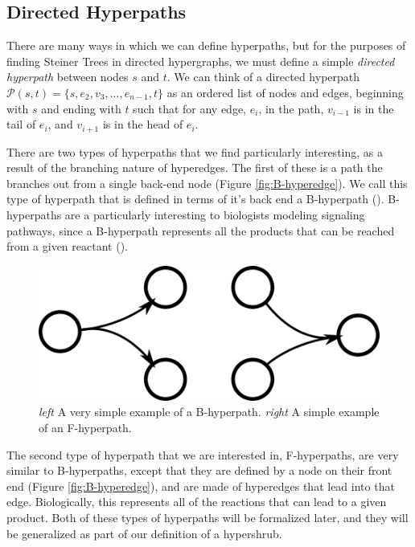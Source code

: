 \documentclass[12pt,twoside]{reedthesis}
\theoremstyle{definition}
\begin{document}
\subsection{Directed Hyperpaths}

There are many ways in which we can define hyperpaths, but for the purposes of finding Steiner Trees in directed hypergraphs, we must define a simple \textit{directed hyperpath} between nodes $s$ and $t$. We can think of a directed hyperpath $\mathcal{P}(s,t)=\{s,e_2,v_3,...,e_{n-1},t\}$ as an ordered list of nodes and edges, beginning with $s$ and ending with $t$ such that for any edge, $e_i$, in the path, $v_{i-1}$ is in the tail of $e_i$, and $v_{i+1}$ is in the head of $e_i$.\par

There are two types of hyperpaths that we find particularly interesting, as a result of the branching nature of hyperedges. The first of these is a path the branches out from a single back-end node (Figure \ref{fig:B-hyperedge}). We call this type of hyperpath that is defined in terms of it's back end a B-hyperpath (\cite{Gallo1993}). B-hyperpaths are a particularly interesting to biologists modeling signaling pathways, since a B-hyperpath represents all the products that can be reached from a given reactant (\cite{Ritz2014}).

\begin{figure}[!h]
  \begin{center}
    \includegraphics[width=\textwidth/2]{BF-hyperpaths}
  \caption[Simple B-Hypergrah and F-Hypergraph.]{\textit{left }A very simple example of a B-hyperpath. \textit{right }A simple example of an F-hyperpath.}
  \label{fig:BF-hyperedge}
  \end{center}
\end{figure}

The second type of hyperpath that we are interested in, F-hyperpaths, are very similar to B-hyperpaths, except that they are defined by a node on their front end (Figure \ref{fig:B-hyperedge}), and are made of hyperedges that lead into that edge. Biologically, this represents all of the reactions that can lead to a given product. Both of these types of hyperpaths will be formalized later, and they will be generalized as part of our definition of a hypershrub.
\end{document}
